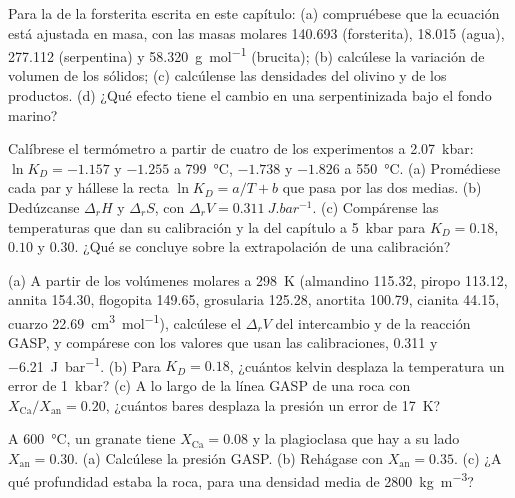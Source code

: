 \begin{exercise}[$\star$]\label{exo:b2:pt-paths:4}
Para la  de la forsterita escrita en este capítulo: (a) compruébese que la
ecuación está ajustada en masa, con las masas molares 140.693 (forsterita), 18.015 (agua),
277.112 (serpentina) y \qty{58.320}{g.mol^{-1}} (brucita); (b) calcúlese la variación de
volumen de los sólidos; (c) calcúlense las densidades del olivino y de los productos.
(d) ¿Qué efecto tiene el cambio en una  serpentinizada bajo el fondo marino?
\end{exercise}

\begin{exercise}[$\star\star$]\label{exo:b2:pt-paths:5}
Calíbrese el termómetro a partir de cuatro de los experimentos a \qty{2.07}{kbar}: $\ln K_D =
-1.157$ y $-1.255$ a \qty{799}{\celsius}, $-1.738$ y $-1.826$ a \qty{550}{\celsius}.
(a) Promédiese cada par y hállese la recta $\ln K_D = a/T + b$ que pasa por las dos medias.
(b) Dedúzcanse $\Delta_r H$ y $\Delta_r S$, con $\Delta_r V = \qty{0.311}{J.bar^{-1}}$.
(c) Compárense las temperaturas que dan su calibración y la del capítulo a
\qty{5}{kbar} para $K_D = 0.18$, $0.10$ y $0.30$. ¿Qué se concluye sobre la
extrapolación de una calibración?
\end{exercise}

\begin{exercise}[$\star\star$]\label{exo:b2:pt-paths:6}
(a) A partir de los volúmenes molares a \qty{298}{K} (almandino 115.32, piropo 113.12, annita
154.30, flogopita 149.65, grosularia 125.28, anortita 100.79, cianita 44.15, cuarzo
\qty{22.69}{cm^3.mol^{-1}}), calcúlese el $\Delta_r V$ del intercambio y de la reacción
GASP, y compárese con los valores que usan las calibraciones, \num{0.311} y
\qty{-6.21}{J.bar^{-1}}. (b) Para $K_D = 0.18$, ¿cuántos kelvin desplaza la temperatura un error de
\qty{1}{kbar}? (c) A lo largo de la línea GASP de una roca con
$X_{\text{Ca}}/X_{\text{an}} = 0.20$, ¿cuántos bares desplaza la presión
un error de \qty{17}{K}?
\end{exercise}

\begin{exercise}[$\star\star$]\label{exo:b2:pt-paths:7}
A \qty{600}{\celsius}, un granate tiene $X_{\text{Ca}} = 0.08$ y la plagioclasa que hay a su lado
$X_{\text{an}} = 0.30$. (a) Calcúlese la presión GASP. (b) Rehágase con $X_{\text{an}} =
0.35$. (c) ¿A qué profundidad estaba la roca, para una densidad media de \qty{2800}{kg.m^{-3}}?
\end{exercise}


